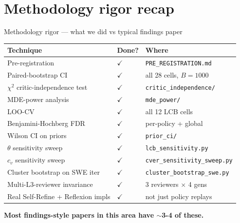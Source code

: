 \documentclass[10pt]{beamer}
\newcommand{\good}[1]{\textcolor{accentGreen}{\textbf{#1}}}
\newcommand{\done}{\textcolor{accentGreen}{$\checkmark$}}
\begin{document}

\section{Methodology rigor recap}

\begin{frame}{Methodology rigor --- what we did vs typical findings paper}
\vspace{0.2cm}
\begin{tabular}{p{4.5cm}p{2cm}p{4cm}}
\toprule
\rowcolor{paleBlue}\textbf{Technique} & \textbf{Done?} & \textbf{Where} \\
\midrule
Pre-registration & \done & \texttt{PRE\_REGISTRATION.md} \\
Paired-bootstrap CI & \done & all 28 cells, $B=1000$ \\
$\chi^2$ critic-independence test & \done & \texttt{critic\_independence/} \\
MDE-power analysis & \done & \texttt{mde\_power/} \\
LOO-CV & \done & all 12 LCB cells \\
Benjamini-Hochberg FDR & \done & per-policy + global \\
Wilson CI on priors & \done & \texttt{prior\_ci/} \\
$\theta$ sensitivity sweep & \done & \texttt{lcb\_sensitivity.py} \\
$c_v$ sensitivity sweep & \done & \texttt{cver\_sensitivity\_sweep.py} \\
Cluster bootstrap on SWE iter & \done & \texttt{cluster\_bootstrap\_swe.py} \\
Multi-L3-reviewer invariance & \done & 3 reviewers $\times$ 4 gens \\
Real Self-Refine + Reflexion impls & \done & not just policy replays \\
\bottomrule
\end{tabular}
\vspace{0.2cm}

\good{Most findings-style papers in this area have $\sim$3-4 of these.}
\end{frame}

\end{document}
